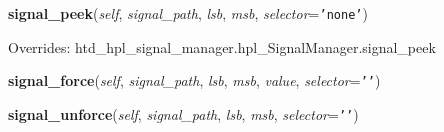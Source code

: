     \vspace{0.5ex}

\hspace{.8\funcindent}\begin{boxedminipage}{\funcwidth}

    \raggedright \textbf{signal\_peek}(\textit{self}, \textit{signal\_path}, \textit{lsb}, \textit{msb}, \textit{selector}={\tt \texttt{'}\texttt{none}\texttt{'}})

\setlength{\parskip}{2ex}
\setlength{\parskip}{1ex}
      Overrides: htd\_hpl\_signal\_manager.hpl\_SignalManager.signal\_peek

    \end{boxedminipage}

    \label{htd_hpl_signal_manager:hpl_SignalManager_non_interactive:signal_force}

    \vspace{0.5ex}

\hspace{.8\funcindent}\begin{boxedminipage}{\funcwidth}

    \raggedright \textbf{signal\_force}(\textit{self}, \textit{signal\_path}, \textit{lsb}, \textit{msb}, \textit{value}, \textit{selector}={\tt \texttt{'}\texttt{}\texttt{'}})

\setlength{\parskip}{2ex}
\setlength{\parskip}{1ex}
    \end{boxedminipage}

    \label{htd_hpl_signal_manager:hpl_SignalManager_non_interactive:signal_unforce}

    \vspace{0.5ex}

\hspace{.8\funcindent}\begin{boxedminipage}{\funcwidth}

    \raggedright \textbf{signal\_unforce}(\textit{self}, \textit{signal\_path}, \textit{lsb}, \textit{msb}, \textit{selector}={\tt \texttt{'}\texttt{}\texttt{'}})

\setlength{\parskip}{2ex}
\setlength{\parskip}{1ex}
    \end{boxedminipage}

